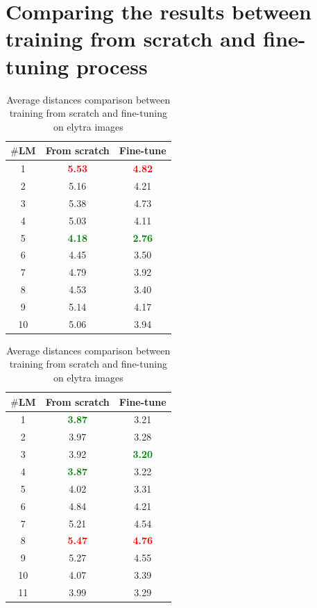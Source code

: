 \documentclass[review]{elsarticle}
\begin{document}
\section{Comparing the results between training from scratch and fine-tuning process}
\label{appdixA1}
\begin{table}[h]
	\begin{minipage}[t]{0.45\textwidth}
		\centering
		\begin{tabular}{|c|c|c|}
		\hline
		\textbf{$\#$LM} & \textbf{From scratch} & \textbf{Fine-tune} \\ \hline
		1 & \textcolor{red}{\textbf{5.53}} & \textcolor{red}{\textbf{4.82}}\\ \hline
		2 & 5.16 & 4.21 \\ \hline
		3 & 5.38  & 4.73 \\ \hline
		4 & 5.03  & 4.11 \\ \hline
		5 & \textcolor{green}{\textbf{4.18}}  & \textcolor{green}{\textbf{2.76}}\\ \hline
		6 & 4.45  & 3.50 \\ \hline
		7 & 4.79  & 3.92 \\ \hline
		8 & 4.53  & 3.40\\ \hline
		9 & 5.14  & 4.17 \\ \hline
		10 & 5.06  & 3.94\\ \hline
	\end{tabular}
	\caption{Average distances comparison between training from scratch and fine-tuning on head images}
	\label{cmptete}
	\end{minipage}
	\hfill
	\begin{minipage}[t]{0.45\textwidth}
		\centering
		\begin{tabular}{|c|c|c|}
			\hline
			\textbf{$\#$LM} & \textbf{From scratch} & \textbf{Fine-tune} \\ \hline
			1 & \textcolor{green}{\textbf{3.87}} & 3.21  \\ \hline
			2 & 3.97 & 3.28 \\ \hline
			3 & 3.92  & \textcolor{green}{\textbf{3.20}}\\ \hline
			4 & \textcolor{green}{\textbf{3.87}}  & 3.22 \\ \hline
			5 & 4.02  & 3.31 \\ \hline
			6 & 4.84  & 4.21\\ \hline
			7 & 5.21  & 4.54 \\ \hline
			8 & \textcolor{red}{\textbf{5.47}}  & \textcolor{red}{\textbf{4.76}}\\ \hline
			9 & 5.27  & 4.55 \\ \hline
			10 & 4.07  & 3.39 \\ \hline
			11 & 3.99  & 3.29 \\ \hline
		\end{tabular}
		\caption{Average distances comparison between training from scratch and fine-tuning on elytra images}
		\label{cmpelytre}
	\end{minipage}
\end{table}
\end{document}
